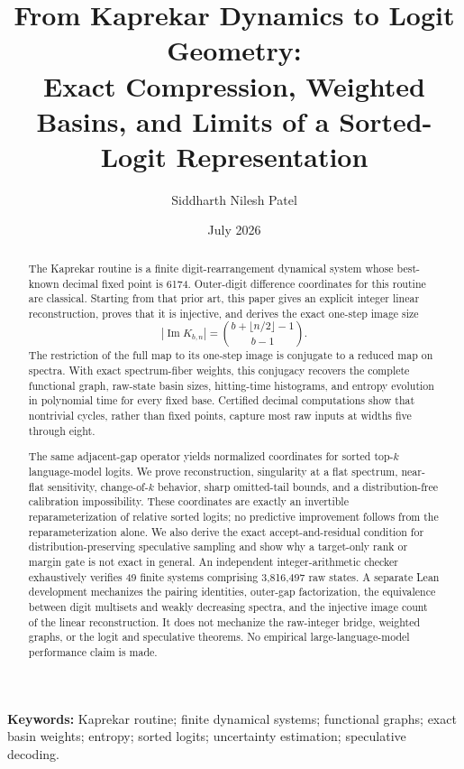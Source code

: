 \documentclass[11pt]{article}
\title{\textbf{From Kaprekar Dynamics to Logit Geometry:}\\
Exact Compression, Weighted Basins, and Limits of a Sorted-Logit Representation}
\author{Siddharth Nilesh Patel}
\date{July 2026}
\theoremstyle{definition}
\theoremstyle{remark}
\newcommand{\1}{\mathbf{1}}
\DeclareMathOperator{\ImMap}{Im}
\begin{document}
\maketitle

\begin{abstract}
The Kaprekar routine is a finite digit-rearrangement dynamical system whose
best-known decimal fixed point is 6174.  Outer-digit difference coordinates
for this routine are classical.  Starting from that prior art, this paper
gives an explicit integer linear reconstruction, proves that it is injective,
and derives the exact one-step image size
\[
  \left|\ImMap K_{b,n}\right|
  =\binom{b+\lfloor n/2\rfloor-1}{b-1}.
\]
The restriction of the full map to its one-step image is conjugate to a
reduced map on spectra.  With exact spectrum-fiber weights, this conjugacy
recovers the complete functional graph, raw-state basin sizes, hitting-time
histograms, and entropy evolution in polynomial time for every fixed base.
Certified decimal computations show that nontrivial cycles, rather than fixed
points, capture most raw inputs at widths five through eight.

The same adjacent-gap operator yields normalized coordinates for sorted
top-$k$ language-model logits.  We prove reconstruction, singularity at a
flat spectrum, near-flat sensitivity, change-of-$k$ behavior, sharp omitted-tail
bounds, and a distribution-free calibration impossibility.  These coordinates
are exactly an invertible reparameterization of relative sorted logits; no
predictive improvement follows from the reparameterization alone.  We also
derive the exact accept-and-residual condition for distribution-preserving
speculative sampling and show why a target-only rank or margin gate is not
exact in general.  An independent integer-arithmetic checker exhaustively
verifies 49 finite systems comprising 3,816,497 raw states.  A separate Lean
development mechanizes the pairing identities, outer-gap factorization, the
equivalence between digit multisets and weakly decreasing spectra, and the
injective image count of the linear reconstruction.  It does not mechanize the
raw-integer bridge, weighted graphs, or the logit and speculative theorems.
No empirical large-language-model performance claim is made.
\end{abstract}

\noindent\textbf{Keywords:}
Kaprekar routine; finite dynamical systems; functional graphs; exact basin
weights; entropy; sorted logits; uncertainty estimation; speculative decoding.
\end{document}
